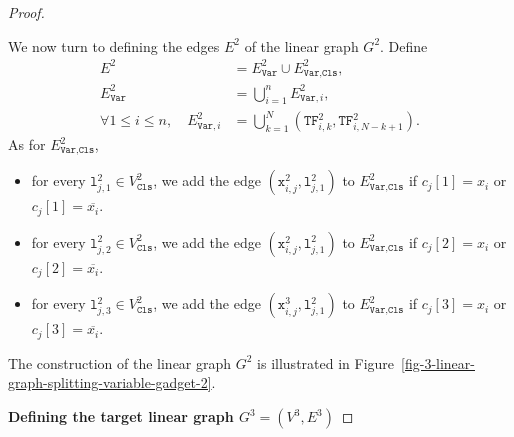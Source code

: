 \begin{proof}
\begin{mdframed}
    We now turn to defining the edges $E^{2}$ of the linear graph $G^{2}$.
    Define
    \begin{align*}
      E^{2} &= E^{2}_{\texttt{Var}} \cup E^{2}_{\texttt{Var},\texttt{Cls}},
      \\
      E^{2}_{\texttt{Var}} &= \bigcup_{i=1}^{n} E^{2}_{\texttt{Var}, i},
      \\
      \forall 1\leq i \leq n,\quad
      E^{2}_{\texttt{Var}, i} &= \bigcup_{k=1}^{N} (\texttt{TF}^{2}_{i,k}, \texttt{TF}^{2}_{i,N-k+1})\text{.}
    \end{align*}
    As for $E^{2}_{\texttt{Var},\texttt{Cls}}$,
    \begin{itemize}
      \item
      for every $\texttt{l}^{2}_{j, 1} \in V^{2}_{\texttt{Cls}}$,
      we add
      the edge $(\texttt{x}^{2}_{i,j}, \texttt{l}^{2}_{j, 1})$
      to $E^{2}_{\texttt{Var},\texttt{Cls}}$
      if $c_{j}[1] = x_{i}$ or $c_{j}[1] = \overline{x_{i}}$.
      \item
      for every $\texttt{l}^{2}_{j, 2} \in V^{2}_{\texttt{Cls}}$,
      we add
      the edge $(\texttt{x}^{2}_{i,j}, \texttt{l}^{2}_{j, 1})$
      to $E^{2}_{\texttt{Var},\texttt{Cls}}$
      if $c_{j}[2] = x_{i}$ or $c_{j}[2] = \overline{x_{i}}$.
      \item
      for every $\texttt{l}^{2}_{j, 3} \in V^{2}_{\texttt{Cls}}$,
      we add
      the edge $(\texttt{x}^{3}_{i,j}, \texttt{l}^{2}_{j, 1})$
      to $E^{2}_{\texttt{Var},\texttt{Cls}}$
      if $c_{j}[3] = x_{i}$ or $c_{j}[3] = \overline{x_{i}}$.
    \end{itemize}
  \end{mdframed}

  The construction of the linear graph $G^{2}$ is illustrated
  in Figure~\ref{fig-3-linear-graph-splitting-variable-gadget-2}.

  

  \medskip
  \textbf{Defining the target linear graph $G^{3} = (V^{3}, E^{3})$}
  \medskip


\end{proof}
